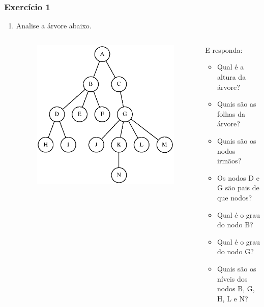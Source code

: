 \documentclass[aspectratio=169]{beamer}
\begin{document}
\begin{frame}[fragile]\frametitle{Exercício 1}
\begin{enumerate}
        \setcounter{enumi}{0}
\item Analise a árvore abaixo.
\begin{columns}[T]
\begin{column}{0.5\linewidth}
\begin{figure}[h]
	\centering
	\includegraphics[height=0.6\paperheight]{imagens/exercicio01.eps}
\end{figure}
\end{column}
\begin{column}{0.5\linewidth}
E responda:
\begin{itemize}
	\item Qual é a altura da árvore?\\
	\item Quais são as folhas da árvore?\\
	\item Quais são os nodos irmãos?\\
	\item Os nodos D e G são pais de que nodos?\\
	\item Qual é o grau do nodo B?\\
	\item Qual é o grau do nodo G?\\
	\item Quais são os níveis dos nodos B, G, H, L e N?\\
\end{itemize}
\end{column}
\end{columns}
\end{enumerate}
\end{frame}
\end{document}
